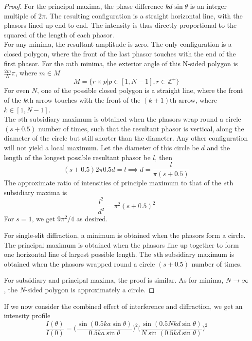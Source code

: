 \documentclass[a4paper]{article}
\begin{document}
\begin{proof}
For the principal maxima, the phase difference $kd\sin\theta$ is an integer multiple of $2\pi$. The resulting configuration is a straight horizontal line, with the phasors lined up end-to-end. The intensity is thus directly proportional to the squared of the length of each phasor.\\[5pt]
For any minima, the resultant amplitude is zero. The only configuration is a closed polygon, where the front of the last phasor touches with the end of the first phasor. For the $m$th minima, the exterior angle of this N-sided polygon is $\frac{2m}{N}\pi$, where 
$m\in M$
$$M=\{r\times p|p\in[1,N-1],r\in\mathbb{Z}^+\}$$
For even $N$, one of the possible closed polygon is a straight line, where the front of the $k$th arrow touches with the front of the $(k+1)$th arrow, where $k\in[1,N-1]$.\\[5pt]
The $s$th subsidiary maximum is obtained when the phasors wrap round a circle $(s+0.5)$ number of times, such that the resultant phasor is vertical, along the diameter of the circle but still shorter than the diameter. Any other configuration will not yield a local maximum. Let the diameter of this circle be $d$ and the length of the longest possible resultant phasor be $l$, then 
$$(s+0.5)2\pi 0.5d=l\implies d=\frac{l}{\pi(s+0.5)}$$
The approximate ratio of intensities of principle maximum to that of the $s$th subsidiary maxima is 
$$\frac{l^2}{d^2}=\pi^2(s+0.5)^2$$
For $s=1$, we get $9\pi^2/4$ as desired.
\begin{cor}
For single-slit diffraction, a minimum is obtained when the phasors form a circle. The principal maximum is obtained when the phasors line up together to form one horizontal line of largest possible length. The $s$th subsidiary maximum is obtained when the phasors wrapped round a circle $(s+0.5)$ number of times.
\end{cor}
For subsidiary and principal maxima, the proof is similar. As for minima, $N\rightarrow\infty$, the $N$-sided polygon is approximately a circle.
\end{proof}
\begin{thm}
If we now consider the combined effect of interference and diffraction, we get an intensity profile
$$\frac{I(\theta)}{I(0)}=\bigg(\frac{\sin(0.5ka\sin\theta)}{0.5ka\sin\theta}\bigg)^2\bigg(\frac{\sin(0.5Nkd\sin\theta)}{N\sin(0.5kd\sin\theta)}\bigg)^2$$
\end{thm}
\end{document}
